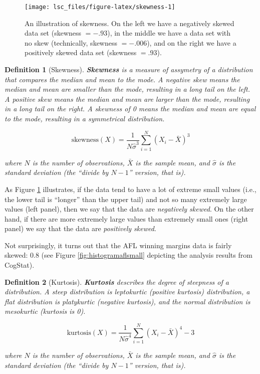 \documentclass[
  11pt,
]{book}
\theoremstyle{indenteddefinition}
\newtheorem{definition}{Definition}[chapter]
\theoremstyle{indenteddefinition}
\theoremstyle{definition}
\theoremstyle{definition}
\theoremstyle{remark}
\begin{document}
\begin{figure}

{\centering \texttt{[image: lsc\_files/figure-latex/skewness-1]} 

}

\caption[An illustration of skewness.]{An illustration of skewness. On the left we have a negatively skewed data set (skewness $= -.93$), in the middle we have a data set with no skew (technically, skewness $= -.006$), and on the right we have a positively skewed data set (skewness $= .93$).}\label{fig:skewness}
\end{figure}

\begin{definition}[Skewness]
\protect\hypertarget{def:defskewness}{}\label{def:defskewness}\textbf{Skewness} is a measure of assymetry of a distribution that compares the median and mean to the mode. A negative skew means the median and mean are smaller than the mode, resulting in a long tail on the left. A positive skew means the median and mean are larger than the mode, resulting in a long tail on the right. A skewness of 0 means the median and mean are equal to the mode, resulting in a symmetrical distribution.

\[
\mbox{skewness}(X) = \frac{1}{N \hat{\sigma}^3} \sum_{i=1}^N (X_i - \bar{X})^3
\]

where \(N\) is the number of observations, \(\bar{X}\) is the sample mean, and \(\hat{\sigma}\) is the standard deviation (the ``divide by \(N-1\)'' version, that is).
\end{definition}

As Figure \ref{fig:skewness} illustrates, if the data tend to have a lot of extreme small values (i.e., the lower tail is ``longer'' than the upper tail) and not so many extremely large values (left panel), then we say that the data are \emph{negatively skewed}. On the other hand, if there are more extremely large values than extremely small ones (right panel) we say that the data are \emph{positively skewed}.

Not surprisingly, it turns out that the AFL winning margins data is fairly skewed: \(0.8\) (see Figure \ref{fig:histogramaflsmall} depicting the analysis results from CogStat).

\begin{definition}[Kurtosis]
\protect\hypertarget{def:defkurtosis}{}\label{def:defkurtosis}\textbf{Kurtosis} describes the degree of steepness of a distribution. A steep distribution is \emph{leptokurtic} (positive kurtosis) distribution, a flat distribution is \emph{platykurtic} (negative kurtosis), and the normal distribution is \emph{mesokurtic} (kurtosis is 0).

\[
\mbox{kurtosis}(X) = \frac{1}{N \hat\sigma^4} \sum_{i=1}^N \left( X_i - \bar{X} \right)^4 - 3
\]

where \(N\) is the number of observations, \(\bar{X}\) is the sample mean, and \(\hat{\sigma}\) is the standard deviation (the ``divide by \(N-1\)'' version, that is).
\end{definition}
\end{document}
